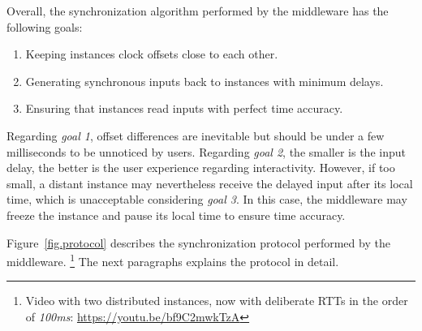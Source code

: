 \documentclass[sigplan,screen]{acmart}
\begin{document}
Overall, the synchronization algorithm performed by the middleware has the
following goals:
%
\begin{enumerate}
\item Keeping instances clock offsets close to each other.
\item Generating synchronous inputs back to instances with minimum delays.
\item Ensuring that instances read inputs with perfect time accuracy.
\end{enumerate}
%
Regarding \emph{goal 1}, offset differences are inevitable but should be under
a few milliseconds to be unnoticed by users.
Regarding \emph{goal 2}, the smaller is the input delay, the better is the user
experience regarding interactivity.
However, if too small, a distant instance may nevertheless receive the delayed
input after its local time, which is unacceptable considering \emph{goal 3}.
In this case, the middleware may freeze the instance and pause its local time
to ensure time accuracy.

Figure~\ref{fig.protocol} describes the synchronization protocol performed by
the middleware.%
\footnote {
    Video with two distributed instances, now with deliberate RTTs in the order
    of \emph{100ms}: \url{https://youtu.be/bf9C2mwkTzA}
}
The next paragraphs explains the protocol in detail.
\end{document}
